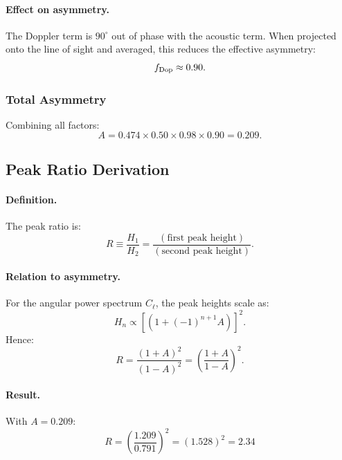 \paragraph{Effect on asymmetry.}
The Doppler term is $90^\circ$ out of phase with the acoustic term. When projected onto the line of sight and averaged, this reduces the effective asymmetry:
\begin{equation}
f_{\rm Dop} \approx 0.90.
\end{equation}

\subsubsection{Total Asymmetry}

Combining all factors:
\begin{equation}
A = 0.474 \times 0.50 \times 0.98 \times 0.90 = 0.209.
\end{equation}

\subsection{Peak Ratio Derivation}\label{app:peak-ratio}

\paragraph{Definition.}
The peak ratio is:
\begin{equation}
R \equiv \frac{H_1}{H_2} = \frac{(\text{first peak height})}{(\text{second peak height})}.
\end{equation}

\paragraph{Relation to asymmetry.}
For the angular power spectrum $C_\ell$, the peak heights scale as:
\begin{equation}
H_n \propto \left[(1 + (-1)^{n+1} A)\right]^2.
\end{equation}
Hence:
\begin{equation}
R = \frac{(1+A)^2}{(1-A)^2} = \left(\frac{1+A}{1-A}\right)^2.
\end{equation}

\paragraph{Result.}
With $A = 0.209$:
\begin{equation}
\boxed{R = \left(\frac{1.209}{0.791}\right)^2 = (1.528)^2 = 2.34}
\end{equation}

